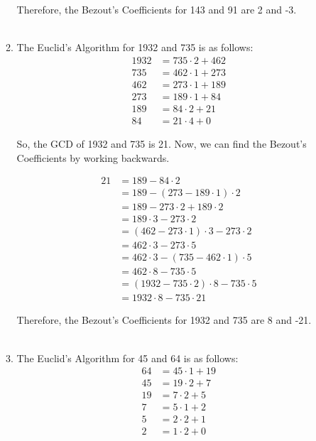 \documentclass[a4paper]{article}
\begin{document}
\begin{enumerate}
\begin{enumerate}
            Therefore, the Bezout's Coefficients for 143 and 91 are 2 and -3. \\ \\
            
            \newpage
            \item The Euclid's Algorithm for 1932 and 735 is as follows:
            \[
                \begin{split}
                    1932 &= 735 \cdot 2 + 462 \\
                    735 &= 462 \cdot 1 + 273 \\
                    462 &= 273 \cdot 1 + 189 \\
                    273 &= 189 \cdot 1 + 84 \\
                    189 &= 84 \cdot 2 + 21 \\
                    84 &= 21 \cdot 4 + 0
                \end{split}
            \]

            So, the GCD of 1932 and 735 is 21. Now, we can find the Bezout's Coefficients by working backwards.

            \[
                \begin{split}
                    21 &= 189 - 84 \cdot 2 \\
                    &= 189 - (273 - 189 \cdot 1) \cdot 2 \\
                    &= 189 - 273 \cdot 2 + 189 \cdot 2 \\
                    &= 189 \cdot 3 - 273 \cdot 2 \\
                    &= (462 - 273 \cdot 1) \cdot 3 - 273 \cdot 2 \\
                    &= 462 \cdot 3 - 273 \cdot 5 \\
                    &= 462 \cdot 3 - (735 - 462 \cdot 1) \cdot 5 \\
                    &= 462 \cdot 8 - 735 \cdot 5 \\
                    &= (1932 - 735 \cdot 2) \cdot 8 - 735 \cdot 5 \\
                    &= 1932 \cdot 8 - 735 \cdot 21
                \end{split}
            \]

            Therefore, the Bezout's Coefficients for 1932 and 735 are 8 and -21. \\ \\

            \item The Euclid's Algorithm for 45 and 64 is as follows:
            \[
                \begin{split}
                    64 &= 45 \cdot 1 + 19 \\
                    45 &= 19 \cdot 2 + 7 \\
                    19 &= 7 \cdot 2 + 5 \\
                    7 &= 5 \cdot 1 + 2 \\
                    5 &= 2 \cdot 2 + 1 \\
                    2 &= 1 \cdot 2 + 0
                \end{split}
            \]


\end{enumerate}
\end{enumerate}
\end{document}
